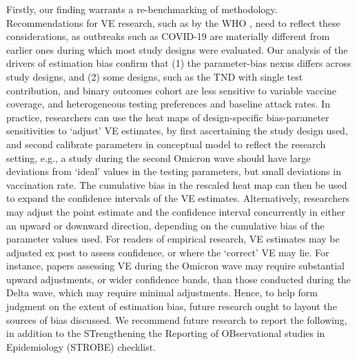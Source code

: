 \documentclass[12pt]{article}
\begin{document}
Firstly, our finding warrants a re-benchmarking of methodology. Recommendations for VE research, such as by the WHO \citep{world2021evaluation}, need to reflect these considerations, as outbreaks such as COVID-19 are materially different from earlier ones during which most study designs were evaluated. Our analysis of the drivers of estimation bias confirm that (1) the parameter-bias nexus differs across study designs, and (2) some designs, such as the TND with single test contribution, and binary outcomes cohort are less sensitive to variable vaccine coverage, and heterogeneous testing preferences and baseline attack rates. In practice, researchers can use the heat maps of design-specific bias-parameter sensitivities to `adjust' VE estimates, by first ascertaining the study design used, and second calibrate parameters in conceptual model to reflect the research setting, e.g., a study during the second Omicron wave should have large deviations from `ideal' values in the testing parameters, but small deviations in vaccination rate. The cumulative bias in the rescaled heat map can then be used to expand the confidence intervals of the VE estimates. Alternatively, researchers may adjust the point estimate and the confidence interval concurrently in either an upward or downward direction, depending on the cumulative bias of the parameter values used. For readers of empirical research, VE estimates may be adjusted ex post to assess confidence, or where the `correct' VE may lie. For instance, papers assessing VE during the Omicron wave may require substantial upward adjustments, or wider confidence bands, than those conducted during the Delta wave, which may require minimal adjustments. Hence, to help form judgment on the extent of estimation bias, future research ought to layout the sources of bias discussed. We recommend future research to report the following, in addition to the STrengthening the Reporting of OBservational studies in Epidemiology (STROBE) checklist.
\end{document}
